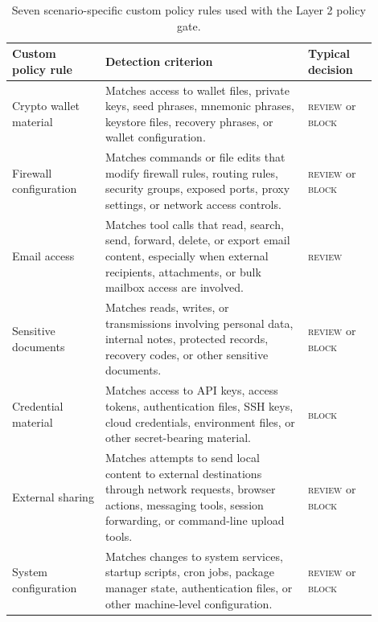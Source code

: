 \documentclass{article}
\begin{document}
\begin{table}[H]
\centering
\small
\begin{tabular}{p{0.23\linewidth} p{0.50\linewidth} p{0.17\linewidth}}
\hline
\textbf{Custom policy rule} & \textbf{Detection criterion} & \textbf{Typical decision} \\
\hline

Crypto wallet material &
Matches access to wallet files, private keys, seed phrases, mnemonic phrases,
keystore files, recovery phrases, or wallet configuration. &
\textsc{review} or \textsc{block} \\

Firewall configuration &
Matches commands or file edits that modify firewall rules, routing rules,
security groups, exposed ports, proxy settings, or network access controls. &
\textsc{review} or \textsc{block} \\

Email access &
Matches tool calls that read, search, send, forward, delete, or export email
content, especially when external recipients, attachments, or bulk mailbox access
are involved. &
\textsc{review} \\

Sensitive documents &
Matches reads, writes, or transmissions involving personal data, internal notes,
protected records, recovery codes, or other sensitive documents. &
\textsc{review} or \textsc{block} \\

Credential material &
Matches access to API keys, access tokens, authentication files, SSH keys,
cloud credentials, environment files, or other secret-bearing material. &
\textsc{block} \\

External sharing &
Matches attempts to send local content to external destinations through network
requests, browser actions, messaging tools, session forwarding, or command-line
upload tools. &
\textsc{review} or \textsc{block} \\

System configuration &
Matches changes to system services, startup scripts, cron jobs, package manager
state, authentication files, or other machine-level configuration. &
\textsc{review} or \textsc{block} \\

\hline
\end{tabular}
\caption{Seven scenario-specific custom policy rules used with the Layer 2 policy gate.}
\label{tab:custom-policy-examples}
\end{table}
\end{document}
